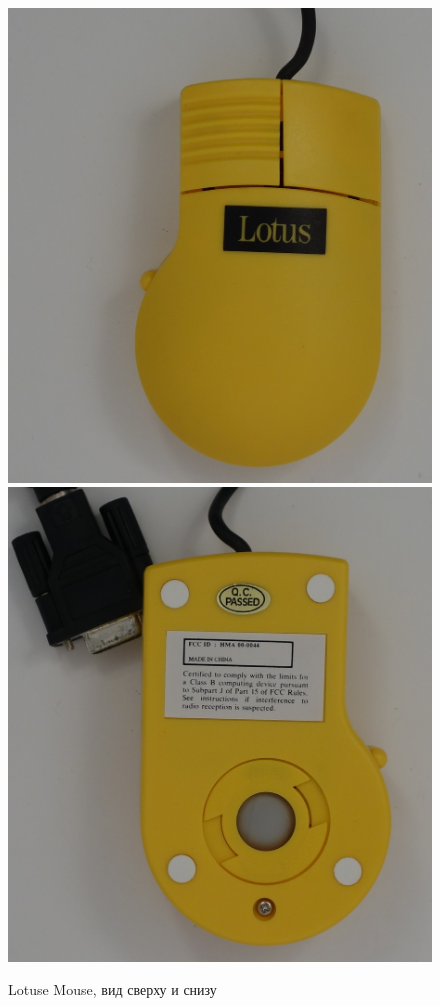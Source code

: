 \documentclass[11pt, a4paper]{article}
\begin{document}
\begin{figure}[h]
    \centering
    \includegraphics[scale=0.3]{1992_lotus_mouse/mis1.JPG}
    \includegraphics[scale=0.3]{1992_lotus_mouse/mis2.JPG}
    \caption{Lotuse Mouse, вид сверху и снизу}
    \label{fig:LotusTopBottom}
\end{figure}
\end{document}
